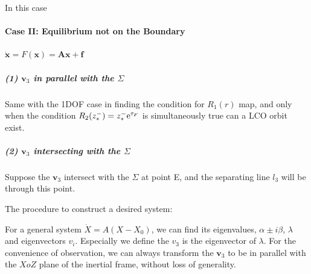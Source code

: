 \documentclass[a4paper,10pt]{article}
\begin{document}
	In this case 
	\paragraph{Case II: Equilibrium not on the Boundary}
	$\dot{\mathbf{x}} =F(\mathbf{x})=\mathbf{A}\mathbf{x} +\mathbf{f}$
	\subparagraph{(1) $\mathbf{v}_3$ in parallel with the $\Sigma$}
	Same with the 1DOF case in finding the condition for $R_1(r)$ map, and only when the condition $R_2(z^-_*) = z^-_* {\rm e}^{\tau_F}$ is simultaneously true can a LCO orbit exist.
	\subparagraph{(2) $\mathbf{v}_3$ intersecting with the $\Sigma$} 
	Suppose the $\mathbf{v}_3$ intersect with the $\Sigma$ at point E, and the separating line $l_3$ will be through this point. 
	
	
	The procedure to construct a desired system:
	
	For a general system $\dot{X}= A(X-X_0)$, we can find its eigenvalues, $\alpha \pm i \beta$, $\lambda$ and  eigenvectors $v_i$. Especially we define the $v_3$ is the eigenvector of $\lambda$. For the convenience of observation, we can always transform the $\mathbf{v}_3$ to be in parallel with the $XoZ$ plane of the inertial frame, without loss of generality.
	
\end{document}
